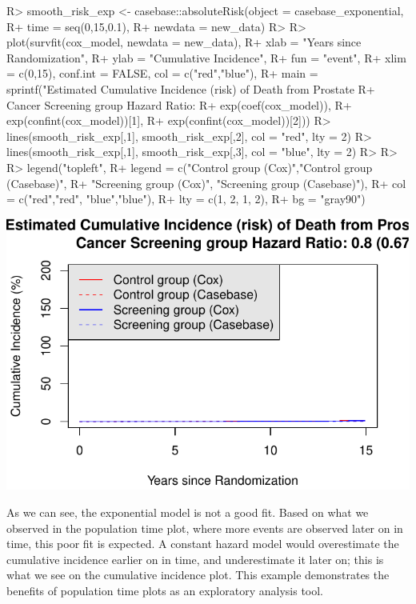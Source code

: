 \documentclass[
]{jss}
\begin{document}
\begin{CodeChunk}

\begin{CodeInput}
R> smooth_risk_exp <- casebase::absoluteRisk(object = casebase_exponential, 
R+                                           time = seq(0,15,0.1), 
R+                                           newdata = new_data)
R> 
R> plot(survfit(cox_model, newdata = new_data),
R+      xlab = "Years since Randomization", 
R+      ylab = "Cumulative Incidence", 
R+      fun = "event",
R+      xlim = c(0,15), conf.int = FALSE, col = c("red","blue"), 
R+      main = sprintf("Estimated Cumulative Incidence (risk) of Death from Prostate 
R+                     Cancer Screening group Hazard Ratio: %
R+                     exp(coef(cox_model)), 
R+                     exp(confint(cox_model))[1], 
R+                     exp(confint(cox_model))[2]))
R> lines(smooth_risk_exp[,1], smooth_risk_exp[,2], col = "red", lty = 2)
R> lines(smooth_risk_exp[,1], smooth_risk_exp[,3], col = "blue", lty = 2)
R> 
R> 
R> legend("topleft", 
R+        legend = c("Control group (Cox)","Control group (Casebase)",
R+                   "Screening group (Cox)", "Screening group (Casebase)"), 
R+        col = c("red","red", "blue","blue"),
R+        lty = c(1, 2, 1, 2), 
R+        bg = "gray90")
\end{CodeInput}


\begin{center}\includegraphics{../figures/erspc-casebase-cif-1} \end{center}

\end{CodeChunk}

As we can see, the exponential model is not a good fit. Based on what we
observed in the population time plot, where more events are observed
later on in time, this poor fit is expected. A constant hazard model
would overestimate the cumulative incidence earlier on in time, and
underestimate it later on; this is what we see on the cumulative
incidence plot. This example demonstrates the benefits of population
time plots as an exploratory analysis tool.
\end{document}
